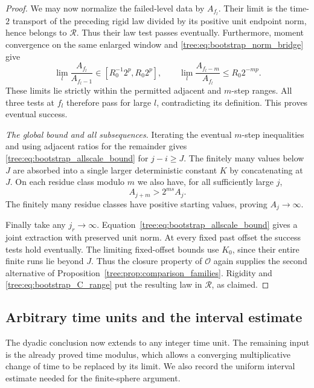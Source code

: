 \begin{proof}
We may now normalize the failed-level data by
$A_{f_l}$.  Their limit is the time-$2$ transport of
the preceding rigid law divided by its positive
unit endpoint norm, hence belongs to $\mathcal R$.
Thus their law test passes eventually.  Furthermore,
moment convergence on the same enlarged window and
\eqref{tree:eq:bootstrap_norm_bridge} give
\[
 \lim_l\frac{A_{f_l}}{A_{f_l-1}}
 \in[R_0^{-1}2^p,R_0 2^p],\qquad
 \lim_l\frac{A_{f_l-m}}{A_{f_l}}
 \leq R_0 2^{-mp}.
\]
These limits lie strictly within the permitted
adjacent and $m$-step ranges.  All three tests at
$f_l$ therefore pass for large $l$, contradicting
its definition.  This proves eventual success.

\smallskip\noindent\emph{The global bound and all subsequences.}
Iterating the eventual $m$-step inequalities and using adjacent
ratios for the remainder gives
\eqref{tree:eq:bootstrap_allscale_bound} for $j-i\geq J$.
The finitely many values below $J$ are absorbed into
a single larger deterministic constant $K$ by
concatenating at $J$.  On each residue class modulo
$m$ we also have, for all sufficiently large $j$,
\[
 A_{j+m}>2^{ms}A_j.
\]
The finitely many residue classes have positive
starting values, proving $A_j\to\infty$.

Finally take any $j_r\to\infty$.
Equation~\eqref{tree:eq:bootstrap_allscale_bound} gives a
joint extraction with preserved unit norm.  At every
fixed past offset the success tests hold eventually.
The limiting fixed-offset bounds use $K_0$, since
their entire finite runs lie beyond $J$.  Thus the
closure property of $\mathcal O$ again supplies the
second alternative of
Proposition~\ref{tree:prop:comparison_families}.  Rigidity
and \eqref{tree:eq:bootstrap_C_range} put the resulting law
in $\mathcal R$, as claimed.
\end{proof}

\subsection{Arbitrary time units and the interval estimate}

The dyadic conclusion now extends to any integer time unit.
The remaining input is the already proved time modulus, which
allows a converging multiplicative change of time to be replaced
by its limit.  We also record the uniform interval estimate needed
for the finite-sphere argument.

